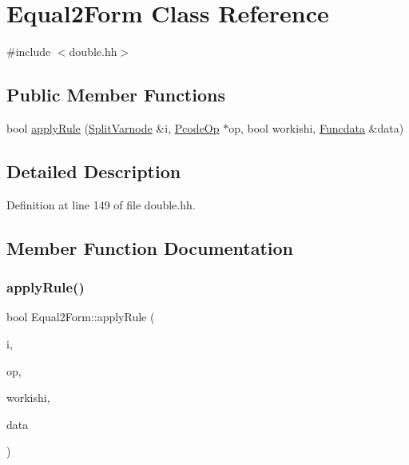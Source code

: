 \hypertarget{class_equal2_form}{}\section{Equal2\+Form Class Reference}
\label{class_equal2_form}


{\ttfamily \#include $<$double.\+hh$>$}

\subsection*{Public Member Functions}
\begin{DoxyCompactItemize}
\item 
bool \mbox{\hyperlink{class_equal2_form_a72028a6dd8b4d87ed6a6f2139f50775c}{apply\+Rule}} (\mbox{\hyperlink{class_split_varnode}{Split\+Varnode}} \&i, \mbox{\hyperlink{class_pcode_op}{Pcode\+Op}} $\ast$op, bool workishi, \mbox{\hyperlink{class_funcdata}{Funcdata}} \&data)
\end{DoxyCompactItemize}


\subsection{Detailed Description}


Definition at line 149 of file double.\+hh.



\subsection{Member Function Documentation}
\mbox{\label{class_equal2_form_a72028a6dd8b4d87ed6a6f2139f50775c}} 
\subsubsection{\texorpdfstring{applyRule()}{applyRule()}}
{\footnotesize\ttfamily bool Equal2\+Form\+::apply\+Rule (\begin{DoxyParamCaption}\item[{\mbox{\hyperlink{class_split_varnode}{Split\+Varnode}} \&}]{i,  }\item[{\mbox{\hyperlink{class_pcode_op}{Pcode\+Op}} $\ast$}]{op,  }\item[{bool}]{workishi,  }\item[{\mbox{\hyperlink{class_funcdata}{Funcdata}} \&}]{data }\end{DoxyParamCaption})}



